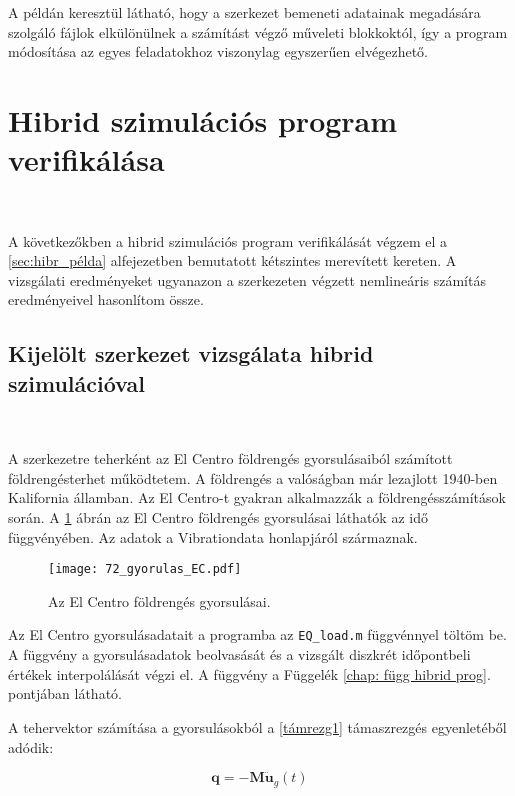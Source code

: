   
  A példán keresztül látható, hogy a szerkezet bemeneti adatainak megadására szolgáló fájlok elkülönülnek a számítást végző műveleti blokkoktól, így a program módosítása az egyes feladatokhoz viszonylag egyszerűen elvégezhető. 
  
  
\section{Hibrid szimulációs program verifikálása}\label{sec: hibrid ver.}

{\ }

A következőkben a hibrid szimulációs program verifikálását végzem el a \ref{sec:hibr_példa} alfejezetben bemutatott kétszintes merevített kereten. A vizsgálati eredményeket ugyanazon a szerkezeten végzett nemlineáris számítás eredményeivel hasonlítom össze.


\subsection{Kijelölt szerkezet vizsgálata hibrid szimulációval}\label{subsec:71_hibrid}

{\ }

A szerkezetre teherként az El Centro földrengés gyorsulásaiból számított földrengésterhet működtetem.  A földrengés a valóságban már lezajlott 1940-ben  Kalifornia államban. Az El Centro-t gyakran alkalmazzák a földrengésszámítások során.  A \ref{fig:ec gyors}  ábrán az El Centro földrengés gyorsulásai  láthatók az idő függvényében. Az adatok a Vibrationdata  \cite{elcentro} honlapjáról származnak.

\begin{figure}[h!]
\centering
\texttt{[image: 72\_gyorulas\_EC.pdf]}
\caption{Az El Centro földrengés gyorsulásai.}
\label{fig:ec gyors}
\end{figure}

Az El Centro gyorsulásadatait  a programba az \verb|EQ_load.m| függvénnyel töltöm be. A függvény a  gyorsulásadatok beolvasását  és a vizsgált diszkrét időpontbeli értékek interpolálását végzi el.  A függvény a Függelék \ref{chap: függ hibrid prog}. pontjában látható. 

A tehervektor számítása a gyorsulásokból a \eqref{támrezg1} támaszrezgés  egyenletéből adódik:

\begin{equation}
 \mathbf{q} = -\mathbf{M}\mathbf{\ddot{u}}_g(t)
\end{equation} 

